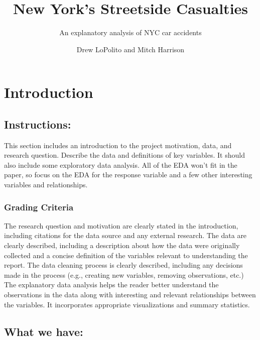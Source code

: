 \documentclass[
  letterpaper,
  DIV=11,
  numbers=noendperiod]{scrartcl}
\title{New York's Streetside Casualties}
\subtitle{An explanatory analysis of NYC car accidents}
\author{Drew LoPolito and Mitch Harrison}
\date{}
\begin{document}
\maketitle
\ifdefined\Shaded\renewenvironment{Shaded}{\begin{tcolorbox}[interior hidden, borderline west={3pt}{0pt}{shadecolor}, sharp corners, enhanced, boxrule=0pt, breakable, frame hidden]}{\end{tcolorbox}}\fi

\hypertarget{introduction}{%
\section{Introduction}\label{introduction}}

\hypertarget{instructions}{%
\subsection{Instructions:}\label{instructions}}

This section includes an introduction to the project motivation, data,
and research question. Describe the data and definitions of key
variables. It should also include some exploratory data analysis. All of
the EDA won't fit in the paper, so focus on the EDA for the response
variable and a few other interesting variables and relationships.

\hypertarget{grading-criteria}{%
\subsubsection{Grading Criteria}\label{grading-criteria}}

The research question and motivation are clearly stated in the
introduction, including citations for the data source and any external
research. The data are clearly described, including a description about
how the data were originally collected and a concise definition of the
variables relevant to understanding the report. The data cleaning
process is clearly described, including any decisions made in the
process (e.g., creating new variables, removing observations, etc.) The
explanatory data analysis helps the reader better understand the
observations in the data along with interesting and relevant
relationships between the variables. It incorporates appropriate
visualizations and summary statistics.

\hypertarget{what-we-have}{%
\subsection{What we have:}\label{what-we-have}}
\end{document}
